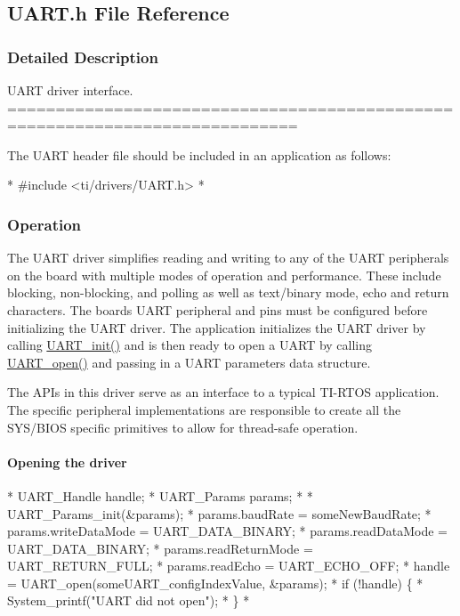 \subsection{U\-A\-R\-T.\-h File Reference}
\label{_u_a_r_t_8h}


\subsubsection{Detailed Description}
U\-A\-R\-T driver interface. ============================================================================

The U\-A\-R\-T header file should be included in an application as follows\-: 
\begin{DoxyCode}
*  #include <ti/drivers/UART.h>
*  
\end{DoxyCode}


\subsubsection*{Operation}

The U\-A\-R\-T driver simplifies reading and writing to any of the U\-A\-R\-T peripherals on the board with multiple modes of operation and performance. These include blocking, non-\/blocking, and polling as well as text/binary mode, echo and return characters. The boards U\-A\-R\-T peripheral and pins must be configured before initializing the U\-A\-R\-T driver. The application initializes the U\-A\-R\-T driver by calling \hyperlink{_u_a_r_t_8h_ab60a36f7295d704926120d22f806dcd1}{U\-A\-R\-T\-\_\-init()} and is then ready to open a U\-A\-R\-T by calling \hyperlink{_u_a_r_t_8h_a0442ea1ec23901168da31726bb3254c1}{U\-A\-R\-T\-\_\-open()} and passing in a U\-A\-R\-T parameters data structure.

The A\-P\-Is in this driver serve as an interface to a typical T\-I-\/\-R\-T\-O\-S application. The specific peripheral implementations are responsible to create all the S\-Y\-S/\-B\-I\-O\-S specific primitives to allow for thread-\/safe operation.

\paragraph*{Opening the driver}


\begin{DoxyCode}
*  UART_Handle      handle;
*  UART_Params      params;
*
*  UART_Params_init(&params);
*  params.baudRate  = someNewBaudRate;
*  params.writeDataMode = UART_DATA_BINARY;
*  params.readDataMode = UART_DATA_BINARY;
*  params.readReturnMode = UART_RETURN_FULL;
*  params.readEcho = UART_ECHO_OFF;
*  handle = UART_open(someUART\_configIndexValue, &params);
*  \textcolor{keywordflow}{if} (!handle) \{
*      System\_printf(\textcolor{stringliteral}{"UART did not open"});
*  \}
*  
\end{DoxyCode}


